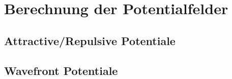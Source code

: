 \chapter{Berechnung der Potentialfelder}



\section{Attractive/Repulsive Potentiale}


\section{Wavefront Potentiale}